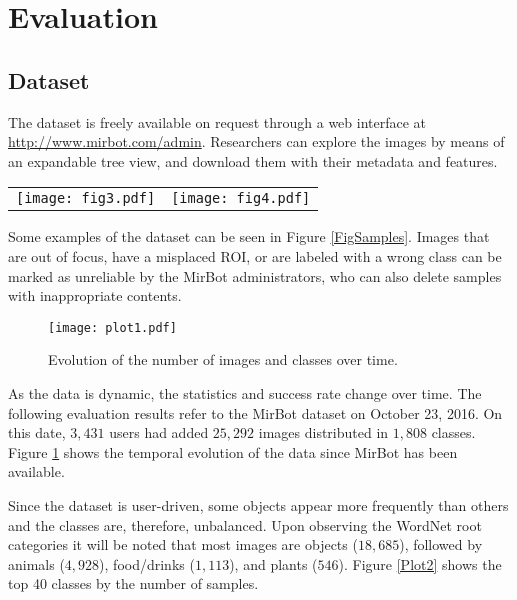 \documentclass[final, twocolumn]{elsarticle}
\begin{document}
\section{Evaluation}
\label{evaluation}


\subsection{Dataset}

The dataset is freely available on request through a web interface at \url{http://www.mirbot.com/admin}. Researchers can explore the images by means of an expandable tree view, and download them with their metadata and features.

\begin{figure*}
\centering
  \begin{tabular}{@{}cc@{}}
    \texttt{[image: fig3.pdf]} &
    \texttt{[image: fig4.pdf]} \\
  \end{tabular}
  \caption{\label{FigSamples}Example of images from banana (left) and computer mouse (right) classes. The bottom-right image with a red background is marked as unreliable, as it is a smartphone.}
\end{figure*}

Some examples of the dataset can be seen in Figure \ref{FigSamples}. Images that are out of focus, have a misplaced ROI, or are labeled with a wrong class can be marked as unreliable by the MirBot administrators, who can also delete samples with inappropriate contents.

\begin{figure}
\center
\texttt{[image: plot1.pdf]}
\caption{\label{Plot1}Evolution  of the number of images and classes over time. }
\end{figure}

As the data is dynamic, the statistics and success rate change over time. The following evaluation results refer to the MirBot dataset on October 23, 2016. On this date, $3,431$ users had added  $25,292$ images distributed in $1,808$ classes. Figure \ref{Plot1} shows the temporal evolution of the data since MirBot has been available.

Since the dataset is user-driven, some objects appear more frequently than others and the classes are, therefore, unbalanced. Upon observing the WordNet root categories it will be noted that most images are objects ($18,685$), followed by animals ($4,928$), food/drinks ($1,113$), and plants ($546$). Figure \ref{Plot2} shows the top 40 classes by the number of samples.
\end{document}
